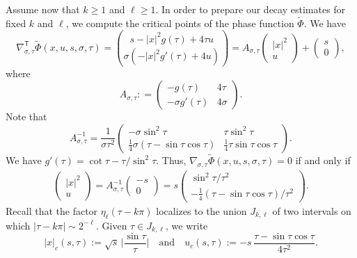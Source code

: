 \documentclass[leqno]{amsart}
\theoremstyle{definition}
\theoremstyle{remark}
\numberwithin{equation}{section}
\begin{document}
Assume now that $k\ge 1$ and $\ell\ge 1.$ In order to prepare our decay estimates for fixed $k$ and $\ell$, we compute the critical points of the phase function $\tilde\Phi$. We have
\[
\nabla_{\sigma,\tau}^{\mathsf T} \tilde \Phi (x,u,s,\sigma,\tau) = \binom{s-|x|^2 g(\tau) + 4 \tau u}{\sigma (-|x|^2 g'(\tau) + 4 u)}
 = A_{\sigma,\tau}
\begin{pmatrix}
 |x|^2 \\ u
\end{pmatrix}
 + \begin{pmatrix}
 s \\ 0
\end{pmatrix},
\]
where
\[
A_{\sigma,\tau} : = \begin{pmatrix}
 -g(\tau) & 4 \tau \\
 -\sigma g'(\tau) & 4 \sigma
\end{pmatrix}.
\]
Note that
\begin{equation}\label{Ainvers}
A_{\sigma,\tau}^{-1}=
\frac 1 {\sigma\tau^2}
\begin{pmatrix}
 -\sigma \sin^2\tau & \tau \sin^2\tau \\
 \frac{1}{4}\sigma(\tau-\sin\tau\cos\tau) &  \frac{1}{4}\tau\sin\tau\cos\tau
\end{pmatrix}.
\end{equation}
We have $g'(\tau) = \cot\tau - \tau/\sin^2\tau$. Thus, $\nabla_{\sigma,\tau} \tilde \Phi(x,u,s,\sigma,\tau) = 0$ if and only if
\begin{align*}
\begin{pmatrix}
 |x|^2 \\ u
\end{pmatrix}
 = 
A_{\sigma,\tau}^{-1}
\begin{pmatrix}
 -s \\ 0
\end{pmatrix}
 = 
s\begin{pmatrix}
 \sin^2\tau/\tau^2 \\ 
 - \frac{1}{4}(\tau-\sin\tau\cos\tau)/\tau^2
\end{pmatrix}.
\end{align*}
Recall that the factor $\eta_\ell(\tau-k \pi)$ localizes to the union  $J_{k,\ell}$ of two intervals on which $|\tau-k \pi| \sim 2^{-\ell}$. 
Given $\tau\in J_{k,\ell}$, we write
\begin{equation}\label{eq:formulas-sing}
|x|_c(s,\tau) := \sqrt{s} \, \Big|\frac{\sin\tau}{\tau}\Big| \quad\text{and}\quad
  u_c(s,\tau) := - s \, \frac{\tau-\sin\tau\cos\tau}{ 4 \tau^2}.
\end{equation}
\end{document}
